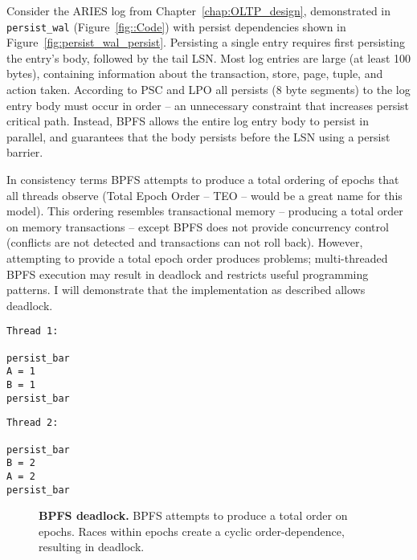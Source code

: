 

Consider the ARIES log from Chapter~\ref{chap:OLTP_design}, demonstrated in \texttt{persist\_wal} (Figure~\ref{fig::Code}) with persist dependencies shown in Figure~\ref{fig:persist_wal_persist}.
Persisting a single entry requires first persisting the entry's body, followed by the tail LSN.
Most log entries are large (at least 100 bytes), containing information about the transaction, store, page, tuple, and action taken.
According to PSC and LPO all persists (8 byte segments) to the log entry body must occur in order -- an unnecessary constraint that increases persist critical path.
Instead, BPFS allows the entire log entry body to persist in parallel, and guarantees that the body persists before the LSN using a persist barrier.

In consistency terms BPFS attempts to produce a total ordering of epochs that all threads observe (Total Epoch Order -- TEO -- would be a great name for this model).
This ordering resembles transactional memory -- producing a total order on memory transactions -- except BPFS does not provide concurrency control (conflicts are not detected and transactions can not roll back).
However, attempting to provide a total epoch order produces problems; multi-threaded BPFS execution may result in deadlock and restricts useful programming patterns.
I will demonstrate that the implementation as described allows deadlock.

{
\singlespacing
\newsavebox{\ThreadOne}
\begin{lrbox}{\ThreadOne}
  \begin{lstlisting}
Thread 1:

persist_bar
A = 1
B = 1
persist_bar
  \end{lstlisting}
\end{lrbox}

\newsavebox{\ThreadTwo}
\begin{lrbox}{\ThreadTwo}
  \begin{lstlisting}
Thread 2:

persist_bar
B = 2
A = 2
persist_bar
  \end{lstlisting}
\end{lrbox}

\begin{figure}[]
\centering
\subfigure{ \usebox{\ThreadOne} }
\hspace{1 in}
\subfigure{ \usebox{\ThreadTwo} }
\caption{\textbf{BPFS deadlock.} BPFS attempts to produce a total order on epochs.  Races within epochs create a cyclic order-dependence, resulting in deadlock.}
\label{fig:BPFS_deadlock}
\end{figure}
}

